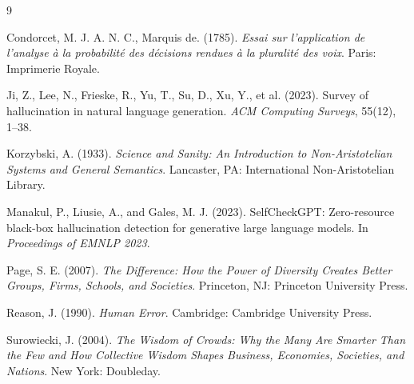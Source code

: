 \documentclass[11pt,letterpaper]{article}
\begin{document}
\begin{thebibliography}{9}

Condorcet, M. J. A. N. C., Marquis de. (1785).
\textit{Essai sur l'application de l'analyse \`a la probabilit\'e des d\'ecisions rendues \`a la pluralit\'e des voix}.
Paris: Imprimerie Royale.

Ji, Z., Lee, N., Frieske, R., Yu, T., Su, D., Xu, Y., et al. (2023).
Survey of hallucination in natural language generation.
\textit{ACM Computing Surveys}, 55(12), 1--38.

Korzybski, A. (1933).
\textit{Science and Sanity: An Introduction to Non-Aristotelian Systems and General Semantics}.
Lancaster, PA: International Non-Aristotelian Library.

Manakul, P., Liusie, A., and Gales, M. J. (2023).
SelfCheckGPT: Zero-resource black-box hallucination detection for generative large language models.
In \textit{Proceedings of EMNLP 2023}.

Page, S. E. (2007).
\textit{The Difference: How the Power of Diversity Creates Better Groups, Firms, Schools, and Societies}.
Princeton, NJ: Princeton University Press.

Reason, J. (1990).
\textit{Human Error}.
Cambridge: Cambridge University Press.

Surowiecki, J. (2004).
\textit{The Wisdom of Crowds: Why the Many Are Smarter Than the Few and How Collective Wisdom Shapes Business, Economies, Societies, and Nations}.
New York: Doubleday.

\end{thebibliography}
\end{document}
